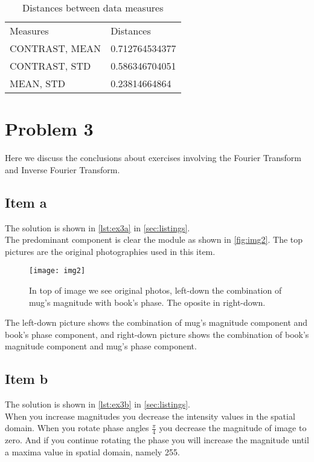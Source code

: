 \documentclass[a4paper,10pt]{article}
\begin{document}
\begin{table}[H]
  \centering
  \caption{Distances between data measures}
  \label{tab1}
  \begin{tabular}{ll}
    Measures	&	Distances      \\
    CONTRAST, MEAN	&	0.712764534377 \\
    CONTRAST, STD	&	0.586346704051 \\
    MEAN, STD	&	0.23814664864  
  \end{tabular}
\end{table}

\section{Problem 3}
Here we discuss the conclusions about exercises involving the Fourier Transform and Inverse Fourier Transform. \\
\subsection{Item a}
The solution is shown in \autoref{lst:ex3a} in \autoref{sec:listings}. \\
The predominant component is clear the module as shown in \autoref{fig:img2}. 
The top pictures are the original photographies used in this item.
\begin{figure}[H]
 \centering
  \texttt{[image: img2]}
  \caption{In top of image we see original photos, left-down the combination of mug's magnitude with book's phase. The oposite in right-down.}
 \label{fig:img2}
\end{figure}

The left-down picture shows the combination of mug's magnitude component and book's phase component, and right-down picture 
shows the combination of book's magnitude component and mug's phase component.

\subsection{Item b}
The solution is shown in \autoref{lst:ex3b} in \autoref{sec:listings}. \\
When you increase magnitudes you decrease the intensity values in the spatial domain. 
When you rotate phase angles $\frac{\pi}{4}$ you decrease the magnitude of image to zero. 
And if you continue rotating the phase you will increase the magnitude until a maxima value in spatial domain, namely 255.
\end{document}
